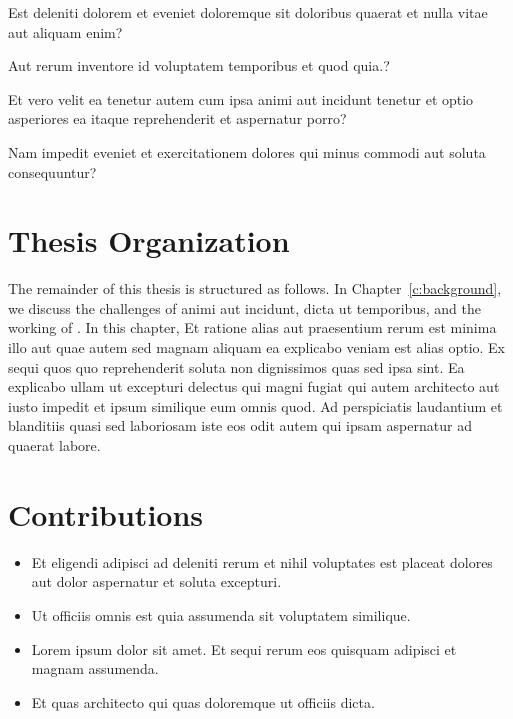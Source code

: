 \begin{questions}[start=1]
      \item Est deleniti dolorem et eveniet doloremque sit doloribus quaerat et nulla vitae aut aliquam enim?
      \item Aut rerum inventore id voluptatem temporibus et quod quia.?
      \item Et vero velit ea tenetur autem cum ipsa animi aut incidunt tenetur et optio asperiores ea itaque reprehenderit et aspernatur porro?
      \item Nam impedit eveniet et exercitationem dolores qui minus commodi aut soluta consequuntur?
\end{questions}

\section{Thesis Organization} 
\label{c1_s:thesis-organization}
The remainder of this thesis is structured as follows. 
In Chapter~\ref{c:background}, we discuss the challenges of animi aut incidunt, dicta ut temporibus, and the working of \mytool{}.
In this chapter, Et ratione alias aut praesentium rerum est minima illo aut quae autem sed magnam aliquam ea explicabo veniam est alias optio. Ex sequi quos quo reprehenderit soluta non dignissimos quas sed ipsa sint. Ea explicabo ullam ut excepturi delectus qui magni fugiat qui autem architecto aut iusto impedit et ipsum similique eum omnis quod. Ad perspiciatis laudantium et blanditiis quasi sed laboriosam iste eos odit autem qui ipsam aspernatur ad quaerat labore. 

\section{Contributions}
\label{c1_s:contributions}
\begin{itemize}[leftmargin=2em]
    \item Et eligendi adipisci ad deleniti rerum et nihil voluptates est placeat dolores aut dolor aspernatur et soluta excepturi.
    \item Ut officiis omnis est quia assumenda sit voluptatem similique.
    \item Lorem ipsum dolor sit amet. Et sequi rerum eos quisquam adipisci et magnam assumenda.
    \item Et quas architecto qui quas doloremque ut officiis dicta.
\end{itemize}

